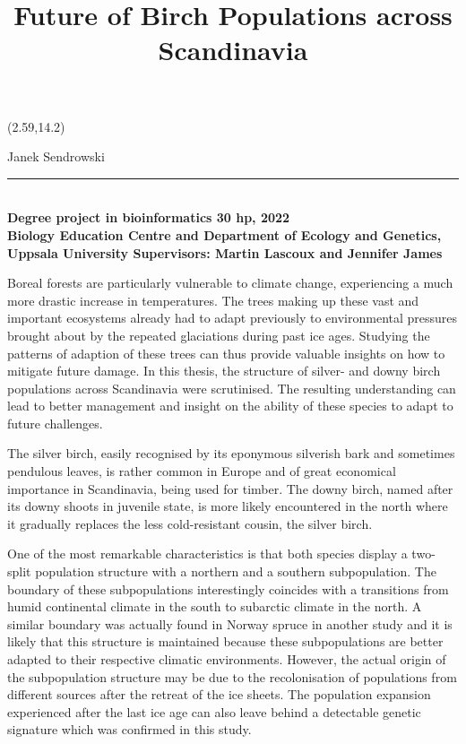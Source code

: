 \documentclass[10pt]{article}
\begin{document}
\setlength{\droptitle}{-1em}
\title{Future of Birch Populations across Scandinavia}
\date{}
\begin{textblock}{10}(2.59,14.2)
        \begin{flushleft}
            \large Janek Sendrowski \\
            \vspace{-0.7em}
            \rule{35.37em}{1pt} \\
            \vspace{-0.02cm}
            \fontsize{9pt}{10.5pt}\color{gray}\textbf{Degree project in bioinformatics 30 hp, 2022 \\
            Biology Education Centre and Department of Ecology and Genetics, \\
            Uppsala University Supervisors: Martin Lascoux and Jennifer James \\}
        \end{flushleft}
    \end{textblock}
 
\maketitle
\vspace{-4em}
Boreal forests are particularly vulnerable to climate change, experiencing a much more drastic increase in temperatures. The trees making up these vast and important ecosystems already had to adapt previously to environmental pressures brought about by the repeated glaciations during past ice ages. Studying the patterns of adaption of these trees can thus provide valuable insights on how to mitigate future damage. In this thesis, the structure of silver-  and downy birch populations across Scandinavia were scrutinised. The resulting understanding can lead to better management and insight on the ability of these species to adapt to future challenges. 

The silver birch, easily recognised by its eponymous silverish bark and sometimes pendulous leaves, is rather common in Europe and of great economical importance in Scandinavia, being used for timber. The downy birch, named after its downy shoots in juvenile state, is more likely encountered in the north where it gradually replaces the less cold-resistant cousin, the silver birch.

One of the most remarkable characteristics is that both species display a two-split population structure with a northern and a southern subpopulation. The boundary of these subpopulations interestingly coincides with a transitions from humid continental climate in the south to subarctic climate in the north. A similar boundary was actually found in Norway spruce in another study and it is likely that this structure is maintained because these subpopulations are better adapted to their respective climatic environments. However, the actual origin of the subpopulation structure may be due to the recolonisation of populations from different sources after the retreat of the ice sheets. The population expansion experienced after the last ice age can also leave behind a detectable genetic signature which was confirmed in this study. 
\end{document}
